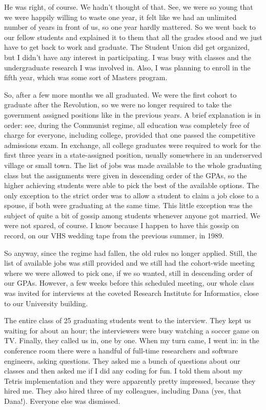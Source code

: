 \documentclass[12pt]{book}
\begin{document}
He was right, of course. We hadn't thought of that. See, we were so
young that we were happily willing to waste one year, it felt like we
had an unlimited number of years in front of us, so one year hardly
mattered. So we went back to our fellow students and explained it to
them that all the grades stood and we just have to get back to work and
graduate. The Student Union did get organized, but I didn't have any
interest in participating. I was busy with classes and the undergraduate
research I was involved in. Also, I was planning to enroll in the fifth
year, which was some sort of Masters program.

So, after a few more months we all graduated. We were the first cohort
to graduate after the Revolution, so we were no longer required to take
the government assigned positions like in the previous years. A brief
explanation is in order: see, during the Communist regime, all education
was completely free of charge for everyone, including college, provided
that one passed the competitive admissions exam. In exchange, all
college graduates were required to work for the first three years in a
state-assigned position, usually somewhere in an underserved village or
small town. The list of jobs was made available to the whole graduating
class but the assignments were given in descending order of the GPAs, so
the higher achieving students were able to pick the best of the
available options. The only exception to the strict order was to allow a
student to claim a job close to a spouse, if both were graduating at the
same time. This little exception was the subject of quite a bit of
gossip among students whenever anyone got married. We were not spared,
of course. I know because I happen to have this gossip on record, on our
VHS wedding tape from the previous summer, in 1989.

So anyway, since the regime had fallen, the old rules no longer applied.
Still, the list of available jobs was still provided and we still had
the cohort-wide meeting where we were allowed to pick one, if we so
wanted, still in descending order of our GPAs. However, a few weeks
before this scheduled meeting, our whole class was invited for
interviews at the coveted Research Institute for Informatics, close to
our University building.

The entire class of 25 graduating students went to the interview. They
kept us waiting for about an hour; the interviewers were busy watching a
soccer game on TV. Finally, they called us in, one by one. When my turn
came, I went in: in the conference room there were a handful of
full-time researchers and software engineers, asking questions. They
asked me a bunch of questions about our classes and then asked me if I
did any coding for fun. I told them about my Tetris implementation and
they were apparently pretty impressed, because they hired me. They also
hired three of my colleagues, including Dana (yes, that Dana!). Everyone
else was dismissed.
\end{document}

